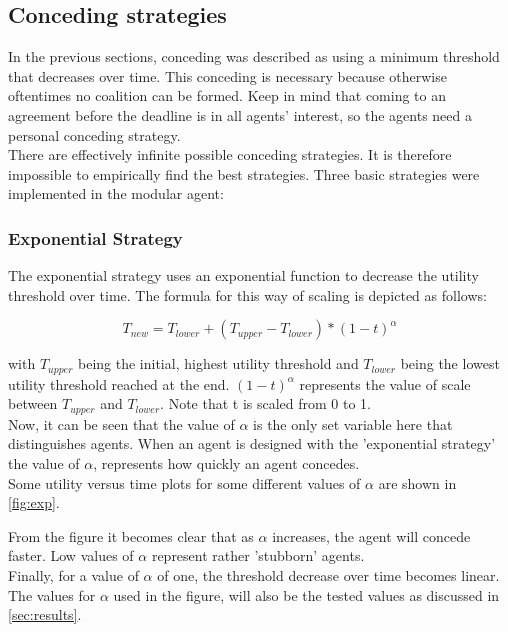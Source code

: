     \subsection{Conceding strategies}
    \label{subsec:conceding}
        In the previous sections, conceding was described as using a minimum threshold that decreases over time. This conceding is necessary because otherwise oftentimes no coalition can be formed. Keep in mind that coming to an agreement before the deadline is in all agents' interest, so the agents need a personal conceding strategy.\\
        There are effectively infinite possible conceding strategies. It is therefore impossible to empirically find the best strategies. Three basic strategies were implemented in the modular agent:
        
        \subsubsection*{Exponential Strategy}
            The exponential strategy uses an exponential function to decrease the utility threshold over time. The formula for this way of scaling is depicted as follows:
            
            \begin{equation}
            \label{exponential}
                T_{new} = T_{lower} + (T_{upper} - T_{lower}) * (1-t)^\alpha
            \end{equation}
            
            with $T_{upper}$ being the initial, highest utility threshold and $T_{lower}$ being the lowest utility threshold reached at the end. $(1-t)^\alpha$ represents the value of scale between $T_{upper}$ and $T_{lower}$. 
            Note that t is scaled from 0 to 1.\\
            Now, it can be seen that the value of $\alpha$ is the only set variable here that distinguishes agents. When an agent is designed with the 'exponential strategy' the value of $\alpha$, represents how quickly an agent concedes.\\
            Some utility versus time plots for some different values of $\alpha$ are shown in \autoref{fig:exp}.
 
            From the figure it becomes clear that as $\alpha$ increases, the agent will concede faster. Low values of $\alpha$ represent rather 'stubborn' agents.\\ Finally, for a value of $\alpha$ of one, the threshold decrease over time becomes linear. The values for $\alpha$ used in the figure, will also be the tested values as discussed in \autoref{sec:results}.
 
